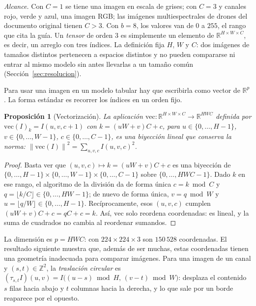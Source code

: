 \documentclass[11pt]{article}
\newtheorem{proposicion}[teorema]{Proposición}
\theoremstyle{definition}
\theoremstyle{remark}
\newcommand{\R}{\mathbb{R}}
\newcommand{\norm}[1]{\left\lVert #1\right\rVert}
\begin{document}
\noindent \emph{Alcance.} Con $C=1$ se tiene una imagen en escala de grises; con $C=3$ y canales rojo, verde y azul, una imagen RGB; las imágenes multiespectrales de drones del documento original tienen $C>3$. Con $b=8$, los valores van de $0$ a $255$, el rango que cita la guía. Un \emph{tensor} de orden $3$ es simplemente un elemento de $\R^{H\times W\times C}$, es decir, un arreglo con tres índices. La definición fija $H$, $W$ y $C$: dos imágenes de tamaños distintos pertenecen a espacios distintos y no pueden compararse ni entrar al mismo modelo sin antes llevarlas a un tamaño común (Sección~\ref{sec:resolucion}).

\medskip

\noindent Para usar una imagen en un modelo tabular hay que escribirla como vector de $\R^p$. La forma estándar es recorrer los índices en un orden fijo.

\begin{proposicion}[Vectorización]\label{prop:vec}
\noindent La aplicación $\mathrm{vec}:\R^{H\times W\times C}\to\R^{HWC}$ definida por $\mathrm{vec}(I)_{k}=I(u,v,c+1)$ con $k=(uW+v)C+c$, para $u\in\{0,\dots,H-1\}$, $v\in\{0,\dots,W-1\}$, $c\in\{0,\dots,C-1\}$, es una biyección lineal que conserva la norma: $\norm{\mathrm{vec}(I)}^2=\sum_{u,v,c}I(u,v,c)^2$.
\end{proposicion}
\begin{proof}
\noindent Basta ver que $(u,v,c)\mapsto k=(uW+v)C+c$ es una biyección de $\{0,\dots,H-1\}\times\{0,\dots,W-1\}\times\{0,\dots,C-1\}$ sobre $\{0,\dots,HWC-1\}$. Dado $k$ en ese rango, el algoritmo de la división da de forma única $c=k\bmod C$ y $q=\lfloor k/C\rfloor\in\{0,\dots,HW-1\}$; de nuevo de forma única, $v=q\bmod W$ y $u=\lfloor q/W\rfloor\in\{0,\dots,H-1\}$. Recíprocamente, esos $(u,v,c)$ cumplen $(uW+v)C+c=qC+c=k$. Así, $\mathrm{vec}$ solo reordena coordenadas: es lineal, y la suma de cuadrados no cambia al reordenar sumandos.
\end{proof}

\noindent La dimensión es $p=HWC$: con $224\times224\times3$ son $150\,528$ coordenadas. El resultado siguiente muestra que, además de ser muchas, estas coordenadas tienen una geometría inadecuada para comparar imágenes. Para una imagen de un canal y $(s,t)\in\mathbb{Z}^2$, la \emph{traslación circular} es $(\tau_{s,t}I)(u,v)=I\big((u-s)\bmod H,\,(v-t)\bmod W\big)$: desplaza el contenido $s$ filas hacia abajo y $t$ columnas hacia la derecha, y lo que sale por un borde reaparece por el opuesto.
\end{document}
